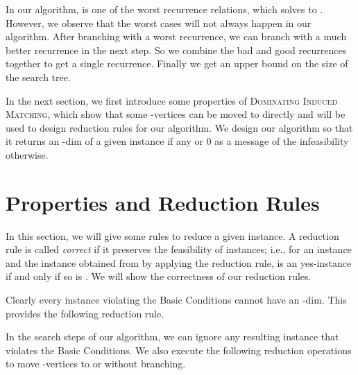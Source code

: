 \documentclass{elsart_TR2}
\begin{document}
\medskip




In our algorithm,  is one of the worst recurrence relations, which solves to .
However, we observe that the worst cases will not always happen in our algorithm. After branching with a worst recurrence,
we can branch with a much better recurrence in the next step. So we combine the bad and good recurrences together to get a single recurrence.
Finally we get an upper bound  on the size of the search tree.



In the next section, we first introduce some properties of \textsc{Dominating Induced Matching},
which show that some -vertices can be moved to  directly and will be used to design reduction rules for our algorithm.
We design our algorithm so that it returns an  -dim of a given instance  if any or
0 as a message of the infeasibility otherwise.




\section{Properties and Reduction Rules}
\label{sec_rules}

In this section, we will give some rules to reduce a given instance.
A reduction rule is called \emph{correct} if it preserves the feasibility of instances; i.e.,
for an instance  and the instance   obtained from  by applying the reduction rule,
    is an yes-instance if and only if so is . We will show the correctness of our reduction rules.


Clearly every instance  violating the Basic Conditions cannot have an -dim.
This provides the following reduction rule.


In the search steps of our algorithm, we can ignore any resulting instance that violates
the Basic Conditions. We also execute the following reduction operations to move -vertices  to  or  without branching.
  
\end{document}
